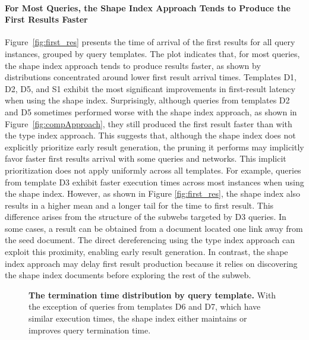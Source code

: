 \paragraph{For Most Queries, the Shape Index Approach Tends to Produce the First Results Faster}
Figure~\ref{fig:first_res} presents the time of arrival of the first results for all query instances, grouped by query templates.
The plot indicates that, for most queries, the shape index approach tends to produce results faster, as shown by distributions concentrated around lower first result arrival times.
Templates D1, D2, D5, and S1 exhibit the most significant improvements in first-result latency when using the shape index.
Surprisingly, although queries from templates D2 and D5 sometimes performed worse with the shape index approach, as shown in Figure~\ref{fig:compApproach}, they still produced the first result faster than with the type index approach.
This suggests that, although the shape index does not explicitly prioritize early result generation, the pruning it performs may implicitly favor faster first results arrival with some queries and networks.
This implicit prioritization does not apply uniformly across all templates.
For example, queries from template D3 exhibit faster execution times across most instances when using the shape index.
However, as shown in Figure \ref{fig:first_res}, the shape index also results in a higher mean and a longer tail for the time to first result.
This difference arises from the structure of the subwebs targeted by D3 queries.
In some cases, a result can be obtained from a document located one link away from the seed document.
The direct dereferencing using the type index approach can exploit this proximity, enabling early result generation.
In contrast, the shape index approach may delay first result production because it relies on discovering the shape index documents before exploring the rest of the subweb.

\begin{figure}
	\centering
	\def\svgwidth{\linewidth}
	
	\caption{
		\textbf{The termination time distribution by query template.}
		With the exception of queries from templates D6 and D7, which have similar execution times, the shape index either maintains or improves query termination time.}
	\label{fig:termination_time}
\end{figure}

